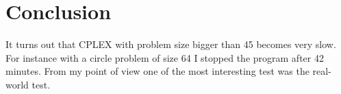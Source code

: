 \section{Conclusion}
It turns out that CPLEX with problem size
bigger than 45 becomes very slow. 
For instance with a circle problem of size 64 I stopped
the program after 42 minutes.
From my point of view one of the most interesting test
was the real-world test.
